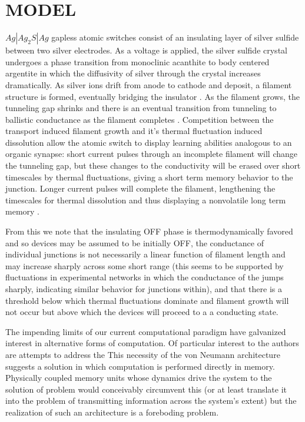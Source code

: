 \documentclass[aps,prl,preprint,groupedaddress]{revtex4-1}
\begin{document}
\section{MODEL}

$Ag | Ag_2 S | Ag$ gapless atomic switches consist of an insulating layer
of silver sulfide between two silver electrodes.  As a voltage is
applied, the silver sulfide crystal undergoes a phase transition from
monoclinic acanthite to body centered argentite in which the diffusivity of
silver through the crystal increases dramatically.  As silver ions drift
from anode to cathode and deposit, a filament structure is formed, eventually
bridging the insulator \cite{Xu2010}. As the filament grows, the
tunneling gap shrinks and there is an eventual transition from tunneling
to ballistic conductance as the filament completes
\cite{Hasegawa2010, Sun2014}. Competition between the transport induced
filament growth and it's thermal fluctuation induced dissolution allow the
atomic switch to display learning abilities analogous to an organic synapse:
short current pulses through an incomplete filament will change the tunneling
gap, but these changes to the conductivity will be erased over short timescales
by thermal fluctuations, giving a short term memory behavior to the junction.
Longer current pulses will complete the filament, lengthening the timescales
for thermal dissolution and thus displaying a nonvolatile long term memory
\cite{Hasegawa2010, Ohno2011}.

From this we note that the insulating OFF phase is thermodynamically favored
and so devices may be assumed to be initially OFF, the conductance of
individual junctions is not necessarily a linear function of filament length
and may increase sharply across some short range (this seems to be supported
by fluctuations in experimental networks in which the conductance of the
jumps sharply, indicating similar behavior for junctions within), and that
there is a threshold below which thermal fluctuations dominate and filament
growth will not occur but above which the devices will proceed to a
a conducting state.

The impending limits of our current computational paradigm have galvanized
interest in alternative forms of computation. Of particular interest to the
authors are attempts to address the 
This necessity of the von Neumann architecture suggests a solution in which
computation is performed directly in memory.  Physically coupled memory units
whose dynamics drive the system to the solution of problem
would conceivably circumvent this (or at least translate it into the
problem of transmitting information across the system's extent) but the
realization of such an architecture is a foreboding problem.
\end{document}
